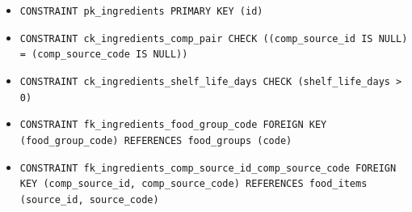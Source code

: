 \begin{itemize}
\item \raggedright {\small\texttt{CONSTRAINT pk\_\allowbreak{}\allowbreak{}ingredients PRIMARY KEY (id)}}
\item \raggedright {\small\texttt{CONSTRAINT ck\_\allowbreak{}\allowbreak{}ingredients\_\allowbreak{}\allowbreak{}comp\_\allowbreak{}\allowbreak{}pair CHECK ((comp\_\allowbreak{}\allowbreak{}source\_\allowbreak{}\allowbreak{}id IS NULL) = (comp\_\allowbreak{}\allowbreak{}source\_\allowbreak{}\allowbreak{}code IS NULL))}}
\item \raggedright {\small\texttt{CONSTRAINT ck\_\allowbreak{}\allowbreak{}ingredients\_\allowbreak{}\allowbreak{}shelf\_\allowbreak{}\allowbreak{}life\_\allowbreak{}\allowbreak{}days CHECK (shelf\_\allowbreak{}\allowbreak{}life\_\allowbreak{}\allowbreak{}days > 0)}}
\item \raggedright {\small\texttt{CONSTRAINT fk\_\allowbreak{}\allowbreak{}ingredients\_\allowbreak{}\allowbreak{}food\_\allowbreak{}\allowbreak{}group\_\allowbreak{}\allowbreak{}code FOREIGN KEY (food\_\allowbreak{}\allowbreak{}group\_\allowbreak{}\allowbreak{}code) REFERENCES food\_\allowbreak{}\allowbreak{}groups (code)}}
\item \raggedright {\small\texttt{CONSTRAINT fk\_\allowbreak{}\allowbreak{}ingredients\_\allowbreak{}\allowbreak{}comp\_\allowbreak{}\allowbreak{}source\_\allowbreak{}\allowbreak{}id\_\allowbreak{}\allowbreak{}comp\_\allowbreak{}\allowbreak{}source\_\allowbreak{}\allowbreak{}code FOREIGN KEY (comp\_\allowbreak{}\allowbreak{}source\_\allowbreak{}\allowbreak{}id, comp\_\allowbreak{}\allowbreak{}source\_\allowbreak{}\allowbreak{}code) REFERENCES food\_\allowbreak{}\allowbreak{}items (source\_\allowbreak{}\allowbreak{}id, source\_\allowbreak{}\allowbreak{}code)}}
\end{itemize}

